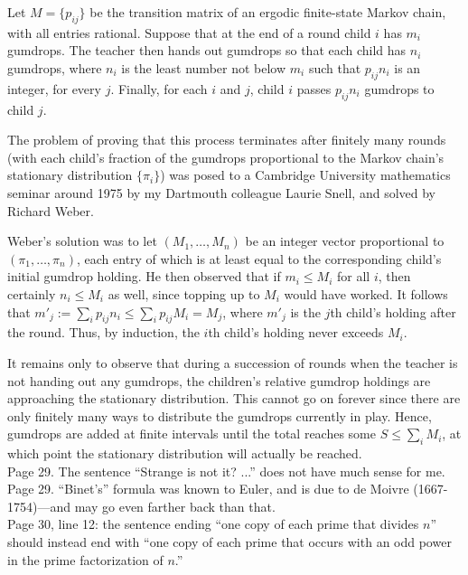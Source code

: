 \documentclass[11pt]{article}
\begin{document}
Let $M = \{p_{ij}\}$ be the transition matrix of an ergodic finite-state Markov chain,
with all entries rational.  Suppose that at the end of a round child $i$ has $m_i$ gumdrops.
The teacher then hands out gumdrops so that each child has $n_i$ gumdrops, where
$n_i$ is the least number not below $m_i$ such that $p_{ij}n_i$ is an integer, for every $j$.  Finally,
for each $i$ and $j$, child $i$ passes $p_{ij}n_i$ gumdrops to child $j$.

The problem of proving that this process terminates after finitely many rounds
(with each child's fraction of the gumdrops proportional to the Markov chain's
stationary distribution $\{\pi_i\}$) was posed to a Cambridge University mathematics seminar
around 1975 by my Dartmouth colleague Laurie Snell, and solved by Richard Weber.

Weber's solution was to let $(M_1,\dots,M_n)$ be an integer vector proportional
to $(\pi_1,\dots,\pi_n)$, each entry of which is at least equal to the corresponding child's
initial gumdrop holding.  He then observed that if $m_i \le M_i$ for all $i$, then 
certainly $n_i \le M_i$ as well, since topping up to $M_i$ would have worked.
It follows that $m'_j := \sum_i p_{ij} n_i \le \sum_i p_{ij} M_i = M_j$, where
$m'_j$ is the $j$th child's holding after the round.  Thus, by induction, the $i$th
child's holding never exceeds $M_i$.

It remains only to observe that during a succession of rounds when the teacher is
not handing out any gumdrops, the children's relative gumdrop holdings are approaching
the stationary distribution.  This cannot go on forever since there are only finitely
many ways to distribute the gumdrops currently in play.  Hence, gumdrops are added
at finite intervals until the total reaches some $S \le \sum_i M_i$, at which point
the stationary distribution will actually be reached.\\

Page 29. The sentence ``Strange is not it? ...'' does not have much sense for me.\\

Page 29.  ``Binet's'' formula was known to Euler, and is due to de Moivre (1667-1754)---and
may go even farther back than that.\\

Page 30, line 12: the sentence ending ``one copy of each prime that divides $n$'' should
instead end with ``one copy of each prime that occurs with an odd power in the
prime factorization of $n$.''
\end{document}
